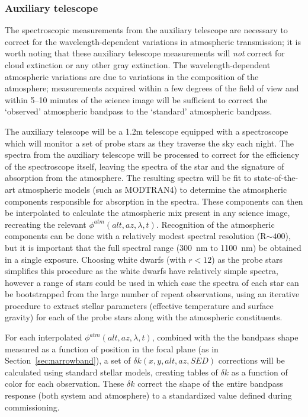 \documentclass[12pt,preprint]{aastex}
\begin{document}
\subsubsection{Auxiliary telescope}
\label{sec:auxtele}

The spectroscopic measurements from the auxiliary telescope are
necessary to correct for the wavelength-dependent variations in
atmospheric transmission; it is worth noting that these auxiliary
telescope measurements will {\it not} correct for cloud extinction or
any other gray extinction. The wavelength-dependent atmospheric
variations are due to variations in the composition of the atmosphere;
measurements acquired within a few degrees of the field of view and
within 5--10 minutes of the science image will be sufficient to
correct the `observed' atmospheric bandpass to the `standard'
atmospheric bandpass.

The auxiliary telescope will be a 1.2m telescope equipped with a
spectroscope which will monitor a set of probe stars as they traverse
the sky each night. The spectra from the auxiliary telescope will be
processed to correct for the efficiency of the spectroscope itself,
leaving the spectra of the star and the signature of absorption from
the atmosphere. The resulting spectra will be fit to state-of-the-art
atmospheric models (such as MODTRAN4) to determine the atmospheric
components responsible for absorption in the spectra. These components
can then be interpolated to calculate the atmospheric mix present in
any science image, recreating the relevant
$\phi^{atm}(alt,az,\lambda,t)$. Recognition of the atmospheric components
can be done with a relatively modest spectral resolution (R$\sim400$),
but it is important that the full spectral range (300~nm to 1100~nm)
be obtained in a single exposure. Choosing white dwarfs (with $r<12$)
as the probe stars simplifies this procedure as the white dwarfs have
relatively simple spectra, however a range of stars could be used in
which case the spectra of each star can be bootstrapped from the large
number of repeat observations, using an iterative procedure to extract
stellar parameters (effective temperature and surface gravity) for
each of the probe stars along with the atmospheric constituents. 

For each interpolated $\phi^{atm}(alt,az,\lambda,t)$, combined with
the the bandpass shape measured as a function of position in the focal
plane (as in Section~\ref{sec:narrowband}), a set of $\delta
k(x,y,alt,az,SED)$ corrections will be calculated using standard
stellar models, creating tables of $\delta k$ as a
function of color for each observation. These $\delta k$ correct the shape of the entire
bandpass response (both system and atmosphere) to a standardized value
defined during commissioning.
\end{document}

